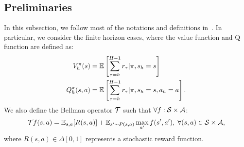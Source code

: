 \subsection{Preliminaries}
In this subsection, we follow most of the notations and definitions in~\citet{song2023hybrid}. In particular, we consider the finite horizon cases, where the value function and Q function are defined as:
\begin{align}
    V_h^\pi(s) &= \mathbb E\left[ \sum_{\tau=h}^{H-1}r_\tau|\pi, s_h=s \right]\\
    Q_h^\pi(s,a) &= \mathbb E\left[ \sum_{\tau=h}^{H-1}r_\tau|\pi,s_h=s,a_h=a \right].
\end{align}
We also define the Bellman operator $\mathcal T$ such that $\forall f:\mathcal S\times \mathcal A$:
\begin{equation}
    \mathcal T f(s,a) = \mathbb E_{s,a}[R(s,a)] + \mathbb E_{s^\prime \sim P(s,a)}\max_{a^\prime} f(s^\prime, a^\prime),\;\forall (s,a)\in \mathcal S\times \mathcal A,
\end{equation}
where $R(s,a)\in \Delta[0,1]$ represents a stochastic reward function.


